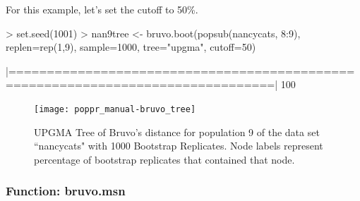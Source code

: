 \documentclass[letterpaper]{article}
\begin{document}
For this example, let's set the cutoff to 50\%.
\begin{Schunk}
\begin{Sinput}
> set.seed(1001)
> nan9tree <- bruvo.boot(popsub(nancycats, 8:9), replen=rep(1,9), sample=1000, tree="upgma", cutoff=50)
\end{Sinput}
\end{Schunk}
\begin{Schunk}
\begin{Soutput}
|================================================================================| 100%
\end{Soutput}
\end{Schunk}
\begin{figure}[h!]
  \centering
  \caption{UPGMA Tree of Bruvo's distance for population 9 of the data set ``nancycats" with 1000 Bootstrap Replicates. Node labels represent percentage of bootstrap replicates that contained that node.}
  \label{bruvo_upgma}
\texttt{[image: poppr\_manual-bruvo\_tree]}
\end{figure}
\subsubsection{Function: bruvo.msn}
\end{document}
